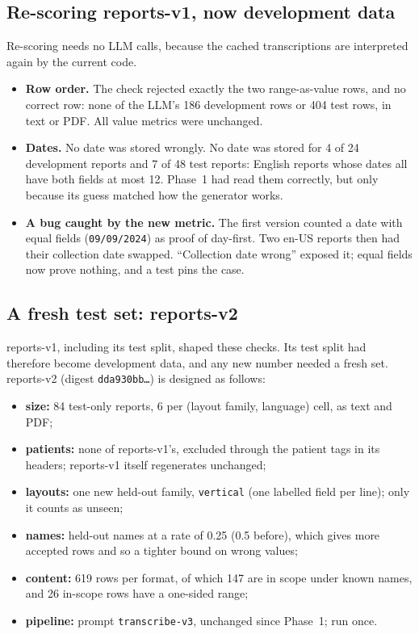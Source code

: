 \documentclass[11pt,a4paper]{article}
\begin{document}
\subsection{Re-scoring reports-v1, now development data}
Re-scoring needs no LLM calls, because the cached transcriptions are interpreted again by the current code.
\begin{itemize}
  \item \textbf{Row order.} The check rejected exactly the two range-as-value rows, and no correct row: none of the LLM's 186 development rows or 404 test rows, in text or PDF. All value metrics were unchanged.
  \item \textbf{Dates.} No date was stored wrongly. No date was stored for 4 of 24 development reports and 7 of 48 test reports: English reports whose dates all have both fields at most 12. Phase~1 had read them correctly, but only because its guess matched how the generator works.
  \item \textbf{A bug caught by the new metric.} The first version counted a date with equal fields (\texttt{09/09/2024}) as proof of day-first. Two en-US reports then had their collection date swapped. ``Collection date wrong'' exposed it; equal fields now prove nothing, and a test pins the case.
\end{itemize}

\subsection{A fresh test set: reports-v2}
reports-v1, including its test split, shaped these checks. Its test split had therefore become development data, and any new number needed a fresh set. reports-v2 (digest \texttt{dda930bb\ldots}) is designed as follows:
\begin{itemize}[nosep]
  \item \textbf{size:} 84 test-only reports, 6 per (layout family, language) cell, as text and PDF;
  \item \textbf{patients:} none of reports-v1's, excluded through the patient tags in its headers; reports-v1 itself regenerates unchanged;
  \item \textbf{layouts:} one new held-out family, \texttt{vertical} (one labelled field per line); only it counts as unseen;
  \item \textbf{names:} held-out names at a rate of 0.25 (0.5 before), which gives more accepted rows and so a tighter bound on wrong values;
  \item \textbf{content:} 619 rows per format, of which 147 are in scope under known names, and 26 in-scope rows have a one-sided range;
  \item \textbf{pipeline:} prompt \texttt{transcribe-v3}, unchanged since Phase~1; run once.
\end{itemize}
\end{document}
